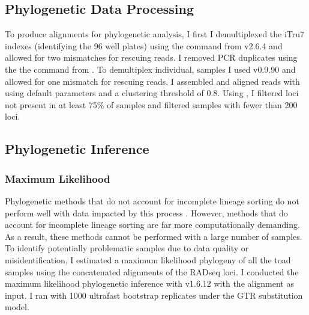 \subsection{Phylogenetic Data Processing}
To produce alignments for phylogenetic analysis, I first I demultiplexed the 
iTru7 indexes (identifying the 96 well plates) using the \processradtags command from \stacks v2.6.4 
\parencites{rochette2019} and allowed for two mismatches for rescuing reads.
I removed PCR duplicates using the the \clonefilter command from \stacks.
To demultiplex individual, samples I used \pyrad v0.9.90 and allowed for one 
mismatch for rescuing reads. 
I assembled and aligned reads with \pyrad using default parameters and a 
clustering threshold of 0.8. 
Using \pyrad, I filtered loci not present in at least 75\% of samples 
and filtered samples with fewer than 200 loci.

\subsection{Phylogenetic Inference}
\subsubsection{Maximum Likelihood}
Phylogenetic methods that do not account for incomplete lineage sorting  
do not perform well with data impacted by this process \parencite{degnan2009}.
However, methods that do account for incomplete lineage sorting are far more 
computationally demanding.
As a result, these methods cannot be performed with a large number of samples.
To identify potentially problematic samples due to data quality or 
misidentification, I estimated a maximum likelihood phylogeny of all the toad 
samples using the concatenated alignments of the RADseq loci.
I conducted the maximum likelihood phylogenetic inference with \iqtree 
v1.6.12 \parencite{nguyen2015} with the \pyrad alignment as input. 
I ran \iqtree with 1000 ultrafast bootstrap replicates \parencite{hoang2018}
under the GTR substitution model.

